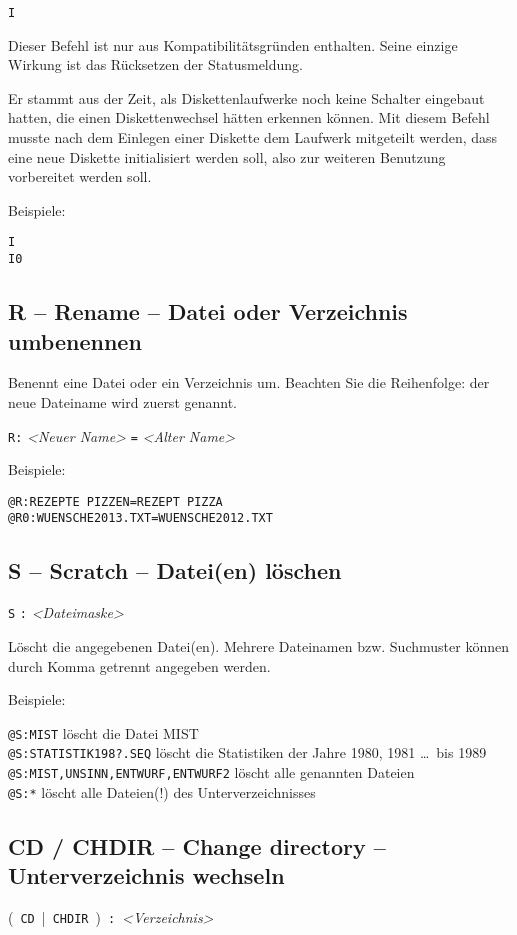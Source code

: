 \documentclass[10pt,a4paper]{scrartcl}		%
\begin{document}
\texttt{I} 

Dieser Befehl ist nur aus Kompatibilitätsgründen enthalten.
Seine einzige Wirkung ist das Rücksetzen der Statusmeldung.

Er stammt aus der Zeit, als Diskettenlaufwerke noch keine Schalter
eingebaut hatten, die einen Diskettenwechsel hätten erkennen können.
Mit diesem Befehl musste nach dem Einlegen einer Diskette dem
Laufwerk mitgeteilt werden, dass eine neue Diskette initialisiert
werden soll, also zur weiteren Benutzung vorbereitet werden soll.

Beispiele:
\begin{verbatim}
I
I0
\end{verbatim}

\subsection{R -- Rename -- Datei oder Verzeichnis umbenennen}
Benennt eine Datei oder ein Verzeichnis um. Beachten Sie die Reihenfolge:
der neue Dateiname wird zuerst genannt.

\texttt{R} \texttt{:}
\textit{<Neuer Name>} \texttt{=} \textit{<Alter Name>}

Beispiele:
\begin{verbatim}
@R:REZEPTE PIZZEN=REZEPT PIZZA
@R0:WUENSCHE2013.TXT=WUENSCHE2012.TXT
\end{verbatim}

\subsection{S -- Scratch -- Datei(en) löschen}
\texttt{S}  \texttt{:}
\textit{<Dateimaske>} \Big[ \texttt{,} \ldots \  \Big]

Löscht die angegebenen Datei(en). Mehrere Dateinamen bzw. Suchmuster
können durch Komma getrennt angegeben werden.

Beispiele:

\texttt{@S:MIST} löscht die Datei MIST\\
\texttt{@S:STATISTIK198?.SEQ} löscht die Statistiken der Jahre 1980, 1981 
\ldots \ bis 1989 \\
\texttt{@S:MIST,UNSINN,ENTWURF,ENTWURF2} löscht alle genannten Dateien \\
\texttt{@S:*} löscht alle Dateien(!) des Unterverzeichnisses

\subsection{CD / CHDIR -- Change directory -- Unterverzeichnis wechseln}
\mbox{\Big( \texttt{CD} \Big| \texttt{CHDIR} \Big) 
\texttt{:} \textit{<Verzeichnis>}}
\end{document}

